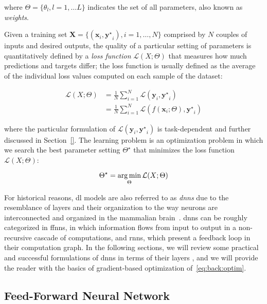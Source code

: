 where $\Theta = \{\theta_l, l = 1, \dots L\}$ indicates the set of all parameters, also known as \emph{weights}.

Given a training set $\mathbf{X} = \{(\mathbf{x}_i, \mathbf{y^\star}_i), i=1,\dots,N\}$ comprised by $N$ couples of inputs and desired outputs, the quality of a particular setting of parameters is quantitatively defined by a \emph{loss function} $\mathcal{L}(X; \Theta)$ that measures how much predictions and targets differ;
the loss function is usually defined as the average of the individual loss values computed on each sample of the dataset:

\begin{align}
    \mathcal{L}(X; \Theta) &= \frac{1}{N} \sum_{i=1}^N \mathcal{L}(\mathbf{y}_i, \mathbf{y^\star}_i) \\
                           &= \frac{1}{N} \sum_{i=1}^N \mathcal{L}(f(\mathbf{x}_i; \Theta), \mathbf{y^\star}_i)
\end{align}

where the particular formulation of $\mathcal{L}(\mathbf{y}_i, \mathbf{y^\star}_i)$ is task-dependent and further discussed in Section~\ref{}. %
The learning problem is an optimization problem in which we search the best parameter setting $\Theta^\star$ that minimizes the loss function $\mathcal{L}(X; \Theta)$:

\begin{equation} \label{eq:back:optim}
    \Theta^\star = \operatorname*{arg\,min}_\Theta \mathcal{L}(X; \Theta)
\end{equation}

For historical reasons, \gls{dl} models are also referred to as \emph{\glspl{dnn}} due to the resemblance of layers and their organization to the way neurons are interconnected and organized in the mammalian brain~\cite{}.  %
\Glspl{dnn} can be roughly categorized in \glspl{ffnn}, in which information flows from input to output in a non-recursive cascade of computations, and \glspl{rnn}, which present a feedback loop in their computation graph.
In the following sections, we will review some practical and successful formulations of \glspl{dnn} in terms of their layers
, and we will provide the reader with the basics of gradient-based optimization of~\eqref{eq:back:optim}.

\subsection{Feed-Forward Neural Network}
\label{subsec:back:ffnn}

